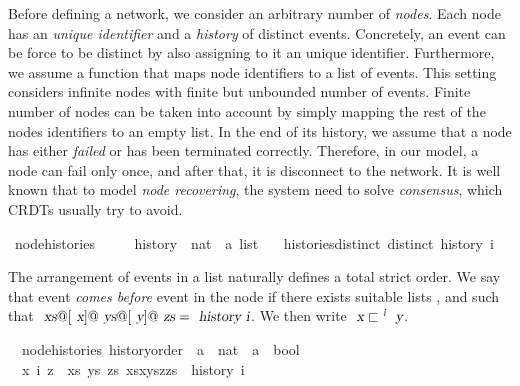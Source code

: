 \documentclass[acmlarge,review,anonymous]{acmart}\settopmatter{printfolios=true}
\begin{document}
Before defining a network, we consider an arbitrary number of \emph{nodes}.
Each node has an \emph{unique identifier} and a \emph{history} of distinct
events.  Concretely, an event can be force to be distinct by also assigning to
it an unique identifier.  Furthermore, we assume a function  that
maps node identifiers to a list of events.  This setting considers infinite
nodes with finite but unbounded number of events. Finite number of nodes can be
taken into account by simply mapping the rest of the nodes identifiers to an
empty list. In the end of its history, we assume that a node has either
\emph{failed} or has been terminated correctly. Therefore, in our model, a node
can fail only once, and after that, it is disconnect to the network. It is well
known that to model \emph{node recovering}, the system need to solve
\emph{consensus}, which CRDTs usually try to avoid.

\begin{isabellebody}
\isanewline
{}\isamarkupfalse%
\ node{\isacharunderscore}histories\ {\isacharequal}\ \isanewline
\ \ \ history\ {\isacharcolon}{\isacharcolon}\ {\isachardoublequoteopen}nat\ {\isasymRightarrow}\ {\isacharprime}a\ list{\isachardoublequoteclose}\isanewline
\ \ \ histories{\isacharunderscore}distinct{\isacharcolon}\ {\isachardoublequoteopen}distinct\ {\isacharparenleft}history\ i{\isacharparenright}{\isachardoublequoteclose}\isanewline
\end{isabellebody}

The arrangement of events in a list naturally defines a total strict
order. We say that event  \emph{comes before} event  in the
node  if there exists suitable lists ,  and 
such that $\isa{xs}@[\isa{x}]@\isa{ys}@[\isa{y}]@\isa{zs} = \isa{history\ i}$.
We then write $\isa{x} \sqsubset^\isa{i} \isa{y}$.

\begin{isabellebody}
\isanewline
{}\isamarkupfalse%
\ {\isacharparenleft}\ node{\isacharunderscore}histories{\isacharparenright}\ history{\isacharunderscore}order\ {\isacharcolon}{\isacharcolon}\ {\isachardoublequoteopen}{\isacharprime}a\ {\isasymRightarrow}\ nat\ {\isasymRightarrow}\ {\isacharprime}a\ {\isasymRightarrow}\ bool{\isachardoublequoteclose}\ {\isacharparenleft}{\isachardoublequoteopen}{\isacharunderscore}{\isacharslash}\ {\isasymsqsubset}\isactrlsup {\isacharunderscore}{\isacharslash}\ {\isacharunderscore}{\isachardoublequoteclose}\ {\isacharbrackleft}{}{}{\isacharcomma}{}{}{}{}{\isacharcomma}{}{}{\isacharbrackright}{}{}{\isacharparenright}\ \isanewline
\ \ {\isachardoublequoteopen}x\ {\isasymsqsubset}\isactrlsup i\ z\ {\isasymequiv}\ {\isasymexists}xs\ ys\ zs{\isachardot}\ xs{\isacharat}x{\isacharhash}ys{\isacharat}z{\isacharhash}zs\ {\isacharequal}\ history\ i{\isachardoublequoteclose}\isanewline
\end{isabellebody}
\end{document}
